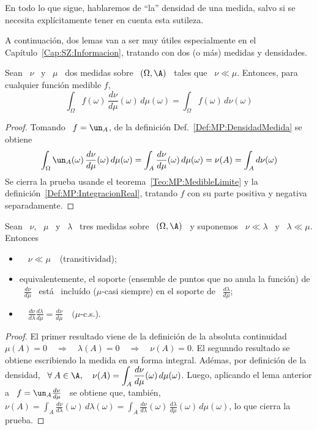 En todo lo que  sigue, hablaremos de ``la'' densidad de una  medida, salvo si se
necesita expl\'icitamente tener en cuenta esta sutileza.

A  continuaci\'on,  dos  lemas  van  a  ser muy  \'utiles  especialmente  en  el
Cap\'itulo~\ref{Cap:SZ:Informacion},  tratando  con  dos  (o  m\'as)  medidas  y
densidades.
%
\begin{lema}
\label{Lem:RelacionIntegracionDerivadasRadon}
%
  Sean \  $\nu$ \ y \  $\mu$ \ dos medidas  sobre \ $(\Omega,\A)$ \  tales que \
  $\nu \ll \mu$. Entonces, para cualquier funci\'on medible $f$,
  \[
  \int_\Omega   f(\omega)  \,   \frac{d\nu}{d\mu}(\omega)   \,  d\mu(\omega)   =
  \int_\Omega f(\omega) \, d\nu(\omega)
  \]
\end{lema}
%
\begin{proof}
  Tomando \ $f =  \un_A$, de la definici\'on Def.~\ref{Def:MP:DensidadMedida} se
  obtiene
  \[
  \int_\Omega  \un_A(\omega)  \,  \frac{d\nu}{d\mu}(\omega)  \,  d\mu(\omega)  =
  \int_A   \frac{d\nu}{d\mu}(\omega)   \,  d\mu(\omega)   =   \nu(A)  =   \int_A
  d\nu(\omega)
  \]
  Se  cierra  la  prueba   usande  el  teorema~\ref{Teo:MP:MedibleLimite}  y  la
  definici\'on~\ref{Def:MP:IntegracionReal}, tratando $f$  con su parte positiva
  y negativa separadamente.
\end{proof}
%
\begin{lema}
\label{Lem:RelacionesDerivadasRadon}
%
  Sean \ $\nu$, \ $\mu$ \ y \ $\lambda$ \ tres medidas sobre \ $(\Omega,\A)$ \ y
  suponemos \ $\nu \ll \lambda$ \ y \ $\lambda \ll \mu$. Entonces
  \begin{itemize}
  \item $\quad \nu \ll \mu \:$ \ (transitividad);
  \item  equivalentemente,  el soporte  (ensemble  de  puntos  que no  anula  la
    funci\'on)  de \  $\displaystyle  \frac{d\nu}{d\mu}$ \  est\'a \  inclu\'ido
    ($\mu$-casi    siempre)    en     el    soporte    de    \    $\displaystyle
    \frac{d\lambda}{d\mu}$;
  \item  $\quad   \displaystyle  \frac{d\nu}{d\lambda}  \frac{d\lambda}{d\mu}  =
    \frac{d\nu}{d\mu} \quad (\mu$-c.s.).
\end{itemize}
\end{lema}
%
\begin{proof}
  El  primer resultado  viene  de  la definici\'on  de  la absoluta  continuidad
  $\mu(A) =  0 \quad  \Rightarrow \quad \lambda(A)  = 0 \quad  \Rightarrow \quad
  \nu(A) =  0$. El  segunndo resultado  se obtiene escribiendo  la medida  en su
  forma integral.   Ad\'emas, por definici\'on de la  densidad, \ $\displaystyle
  \forall  \: A  \in  \A,  \quad \nu(A)  =  \int_A \frac{d\nu}{d\mu}(\omega)  \,
  d\mu(\omega)$.   Luego,   aplicando  el   lema  anterior  a   \  $f   =  \un_A
  \frac{d\nu}{d\mu}$  \ se  obtiene que,  tambi\'en, \  $\displaystyle  \nu(A) =
  \int_A    \frac{d\nu}{d\lambda}(\omega)   \,    d\lambda(\omega)    =   \int_A
  \frac{d\nu}{d\lambda}(\omega)      \,     \frac{d\lambda}{d\mu}(\omega)     \,
  d\mu(\omega)$, lo que cierra la prueba.
\end{proof}

